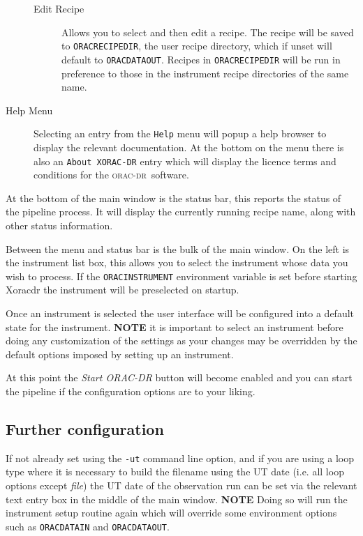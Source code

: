 \documentclass[twoside,11pt]{article}
\renewcommand{\_}{\texttt{\symbol{95}}}
\newcommand{\oracdr}{\textsc{orac-dr}}
\begin{document}
\begin{description}
\begin{description}
\item[Edit Recipe] \mbox{}

Allows you to select and then edit a recipe. The recipe will be saved
to \texttt{ORAC\_RECIPE\_DIR}, the user recipe directory, which if unset will
default to \texttt{ORAC\_DATA\_OUT}. Recipes in \texttt{ORAC\_RECIPE\_DIR} will be run
in preference to those in the instrument recipe directories of the
same name.

\end{description}
\item[Help Menu] \mbox{}

Selecting an entry from the \texttt{Help} menu will popup a help browser to
display the relevant documentation. At the bottom on the menu there is
also an \texttt{About XORAC-DR} entry which will display the licence terms
and conditions for the \oracdr\ software.

\end{description}


At the bottom of the main window is the status bar, this reports the
status of the pipeline process. It will display the currently running
recipe name, along with other status information.



Between the menu and status bar is the bulk of the main window. On the
left is the instrument list box, this allows you to select the
instrument whose data you wish to process. If the \texttt{ORAC\_INSTRUMENT}
environment variable is set before starting Xoracdr the instrument
will be preselected on startup.



Once an instrument is selected the user interface will be configured
into a default state for the instrument. \textbf{NOTE} it is important to
select an instrument before doing any customization of the settings as
your changes may be overridden by the default options imposed by
setting up an instrument.



At this point the \textit{Start ORAC-DR} button will become enabled and you
can start the pipeline if the configuration options are to your
liking.

\subsection*{Further configuration}

If not already set using the \texttt{-ut} command line option, and if you
are using a loop type where it is necessary to build the filename
using the UT date (i.e. all loop options except \textit{file}) the UT date
of the observation run can be set via the relevant text entry box in
the middle of the main window. \textbf{NOTE} Doing so will run the
instrument setup routine again which will override some environment
options such as \texttt{ORAC\_DATA\_IN} and \texttt{ORAC\_DATA\_OUT}.
\end{document}
